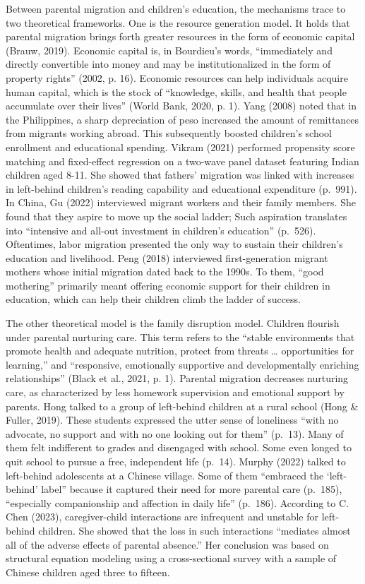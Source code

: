 \documentclass[
  man,floatsintext]{apa7}
\begin{document}
Between parental migration and children's education, the mechanisms trace to two theoretical frameworks. One is the resource generation model. It holds that parental migration brings forth greater resources in the form of economic capital (Brauw, 2019). Economic capital is, in Bourdieu's words, ``immediately and directly convertible into money and may be institutionalized in the form of property rights'' (2002, p. 16). Economic resources can help individuals acquire human capital, which is the stock of ``knowledge, skills, and health that people accumulate over their lives'' (World Bank, 2020, p. 1). Yang (2008) noted that in the Philippines, a sharp depreciation of peso increased the amount of remittances from migrants working abroad. This subsequently boosted children's school enrollment and educational spending. Vikram (2021) performed propensity score matching and fixed-effect regression on a two-wave panel dataset featuring Indian children aged 8-11. She showed that fathers' migration was linked with increases in left-behind children's reading capability and educational expenditure (p.~991). In China, Gu (2022) interviewed migrant workers and their family members. She found that they aspire to move up the social ladder; Such aspiration translates into ``intensive and all-out investment in children's education'' (p.~526). Oftentimes, labor migration presented the only way to sustain their children's education and livelihood. Peng (2018) interviewed first-generation migrant mothers whose initial migration dated back to the 1990s. To them, ``good mothering'' primarily meant offering economic support for their children in education, which can help their children climb the ladder of success.

The other theoretical model is the family disruption model. Children flourish under parental nurturing care. This term refers to the ``stable environments that promote health and adequate nutrition, protect from threats \ldots{} opportunities for learning,'' and ``responsive, emotionally supportive and developmentally enriching relationships'' (Black et al., 2021, p. 1). Parental migration decreases nurturing care, as characterized by less homework supervision and emotional support by parents. Hong talked to a group of left-behind children at a rural school (Hong \& Fuller, 2019). These students expressed the utter sense of loneliness ``with no advocate, no support and with no one looking out for them'' (p.~13). Many of them felt indifferent to grades and disengaged with school. Some even longed to quit school to pursue a free, independent life (p.~14). Murphy (2022) talked to left-behind adolescents at a Chinese village. Some of them ``embraced the `left-behind' label'' because it captured their need for more parental care (p.~185), ``especially companionship and affection in daily life'' (p.~186). According to C. Chen (2023), caregiver-child interactions are infrequent and unstable for left-behind children. She showed that the loss in such interactions ``mediates almost all of the adverse effects of parental absence.'' Her conclusion was based on structural equation modeling using a cross-sectional survey with a sample of Chinese children aged three to fifteen.
\end{document}
